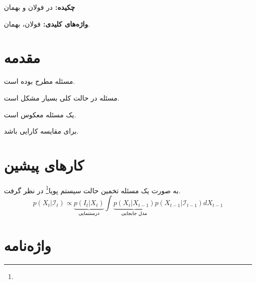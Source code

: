 \documentclass[11pt]{article}
\begin{document}



{\bf {چکيده: }}
در فولان و بهمان


{\bf  { واژه‌های کلیدی: }}
فولان، بهمان.

\setlength{\parindent}{0.25in} %

\section{مقدمه}\label{intro}


مسئله مطرح بوده است.

مسئله در حالت کلی بسیار مشکل است.


یک مسئله معکوس است. 

برای مقایسه کارایی باشد.


\section{کارهای پیشین}\label{sec2}
به صورت یک مسئله تخمین حالت  سیستم پویا\footnote{} در نظر گرفت.
\begin{equation}\label{equ:bayes}
p(X_t|\mathcal{I}_t) \propto  \underbrace{p(I_t|X_t)}_\text{درستنمایی}  \int{ \underbrace{p(X_t|X_{t-1})}_\text{مدل جابجایی} p(X_{t-1}|\mathcal{I}_{t-1}) dX_{t-1}}
\end{equation}

\linespread{1}
\small
\setlength{\parskip}{0pt}
\setlength{\parsep}{0pt}

\renewcommand{\bibname}{مراجع}
\begin{latin}

%

\end{latin}

%


\section*{واژه‌نامه}
\begin{multicols}{3}
\theendnotes 
\end{multicols}
\end{document}
